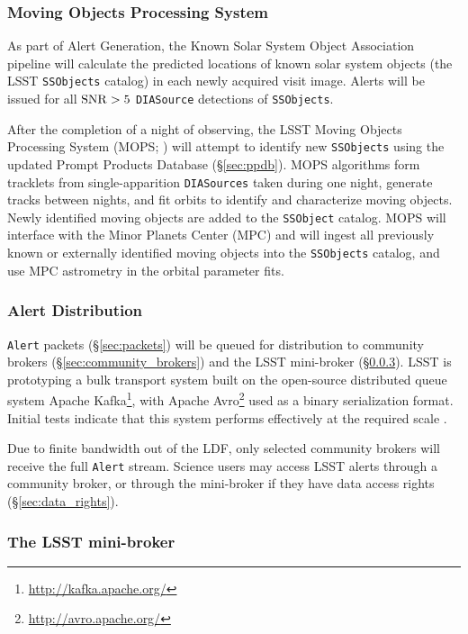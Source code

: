 \subsubsection{Moving Objects Processing System}\label{sec:AGP_MOPS}


As part of Alert Generation, the Known Solar System Object Association pipeline will calculate the predicted locations of known solar system objects (the LSST {\tt SSObjects} catalog) in each newly acquired visit image. 
Alerts will be issued for all ${\rm SNR} > 5$ \texttt{DIASource} detections of \texttt{SSObjects}.

After the completion of a night of observing,
the LSST Moving Objects Processing System (MOPS; ) will attempt to identify new \texttt{SSObjects} using the updated Prompt Products Database (\S \ref{sec:ppdb}).
MOPS algorithms form tracklets from single-apparition \texttt{DIASources} taken during one night, generate tracks between nights, and fit orbits to identify and characterize moving objects.
Newly identified moving objects are added to the {\tt SSObject} catalog.
MOPS will interface with the Minor Planets Center (MPC) and will ingest all previously known or externally identified moving objects into the {\tt SSObjects} catalog, and use MPC astrometry in the orbital parameter fits.


\subsubsection{Alert Distribution} \label{sec:alert_distribution}

\texttt{Alert} packets (\S \ref{sec:packets}) will be queued for distribution to community brokers (\S \ref{sec:community_brokers}) and the LSST mini-broker (\S \ref{sec:mini-broker}). 
LSST is prototyping  a bulk transport system built on the open-source distributed queue system Apache Kafka\footnote{\url{http://kafka.apache.org/}}, with Apache Avro\footnote{\url{http://avro.apache.org/}} used as a binary serialization format.
Initial tests indicate that this system performs effectively at the required scale .

Due to finite bandwidth out of the LDF, only selected community brokers will receive the full \texttt{Alert} stream.
Science users may access LSST alerts through a community broker, or through the mini-broker if they have data access rights (\S \ref{sec:data_rights}).


\subsubsection{The LSST mini-broker}\label{sec:mini-broker}

